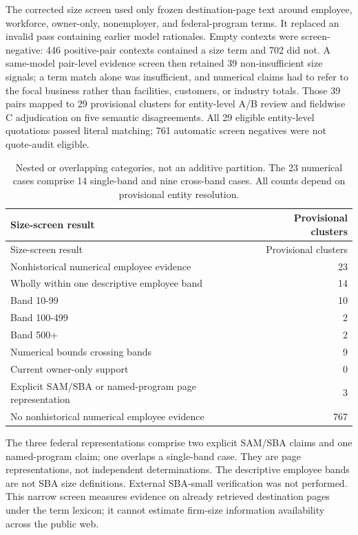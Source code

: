 \documentclass[10pt]{article}
\begin{document}
The corrected size screen used only frozen destination-page text around employee, workforce, owner-only, nonemployer, and federal-program terms. It replaced an invalid pass containing earlier model rationales. Empty contexts were screen-negative: 446 positive-pair contexts contained a size term and 702 did not. A same-model pair-level evidence screen then retained 39 non-insufficient size signals; a term match alone was insufficient, and numerical claims had to refer to the focal business rather than facilities, customers, or industry totals. Those 39 pairs mapped to 29 provisional clusters for entity-level A/B review and fieldwise C adjudication on five semantic disagreements. All 29 eligible entity-level quotations passed literal matching; 761 automatic screen negatives were not quote-audit eligible.

\begin{longtable}[]{@{}lr@{}}
\caption{Nested or overlapping categories, not an additive partition. The 23 numerical cases comprise 14 single-band and nine cross-band cases. All counts depend on provisional entity resolution.}\tabularnewline
\toprule\noalign{}
Size-screen result & Provisional clusters \\
\midrule\noalign{}
\endfirsthead
\toprule\noalign{}
Size-screen result & Provisional clusters \\
\midrule\noalign{}
\endhead
\bottomrule\noalign{}
\endlastfoot
Nonhistorical numerical employee evidence & 23 \\
Wholly within one descriptive employee band & 14 \\
Band 10-99 & 10 \\
Band 100-499 & 2 \\
Band 500+ & 2 \\
Numerical bounds crossing bands & 9 \\
Current owner-only support & 0 \\
Explicit SAM/SBA or named-program page representation & 3 \\
No nonhistorical numerical employee evidence & 767 \\
\end{longtable}

The three federal representations comprise two explicit SAM/SBA claims and one named-program claim; one overlaps a single-band case. They are page representations, not independent determinations. The descriptive employee bands are not SBA size definitions. External SBA-small verification was not performed. This narrow screen measures evidence on already retrieved destination pages under the term lexicon; it cannot estimate firm-size information availability across the public web.
\end{document}
